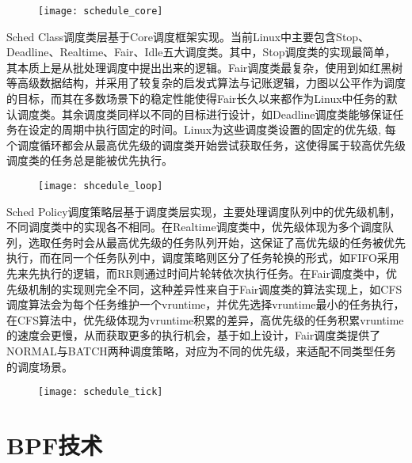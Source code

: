 \begin{figure}[!htbp]
    \centering
    \texttt{[image: schedule\_core]}
    \label{fig:schedule_core}
\end{figure}

Sched Class调度类层基于Core调度框架实现。当前Linux中主要包含Stop、Deadline、Realtime、Fair、Idle五大调度类\citep{scheduler}。其中，Stop调度类的实现最简单，其本质上是从批处理调度中提出出来的逻辑。Fair调度类最复杂，使用到如红黑树等高级数据结构，并采用了较复杂的启发式算法与记账逻辑，力图以公平作为调度的目标，而其在多数场景下的稳定性能使得Fair长久以来都作为Linux中任务的默认调度类。其余调度类同样以不同的目标进行设计，如Deadline调度类能够保证任务在设定的周期中执行固定的时间。Linux为这些调度类设置的固定的优先级, 每个调度循环都会从最高优先级的调度类开始尝试获取任务，这使得属于较高优先级调度类的任务总是能被优先执行。

\begin{figure}[!htbp]
    \centering 
    \texttt{[image: shcedule\_loop]}
    \label{fig:shcedule_loop}
\end{figure}

Sched Policy调度策略层基于调度类层实现，主要处理调度队列中的优先级机制，不同调度类中的实现各不相同。在Realtime调度类中，优先级体现为多个调度队列，选取任务时会从最高优先级的任务队列开始，这保证了高优先级的任务被优先执行，而在同一个任务队列中，调度策略则区分了任务轮换的形式，如FIFO采用先来先执行的逻辑，而RR则通过时间片轮转依次执行任务。在Fair调度类中，优先级机制的实现则完全不同，这种差异性来自于Fair调度类的算法实现上，如CFS调度算法会为每个任务维护一个vruntime，并优先选择vruntime最小的任务执行，在CFS算法中，优先级体现为vruntime积累的差异，高优先级的任务积累vruntime的速度会更慢，从而获取更多的执行机会，基于如上设计，Fair调度类提供了NORMAL与BATCH两种调度策略，对应为不同的优先级，来适配不同类型任务的调度场景。

\begin{figure}[!htbp]
    \centering
    \texttt{[image: schedule\_tick]}
    \label{fig:schedule_tick}
\end{figure}

\section{BPF技术}


